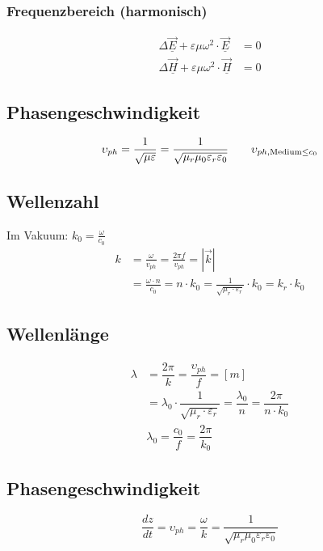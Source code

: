 \subsubsection{Frequenzbereich (harmonisch)}
\begin{align*}
    \Delta \underline{\vec{E}}+\varepsilon \mu \omega^{2} \cdot \underline{\vec{E}}&=0 \\
    \Delta \underline{\vec{H}}+\varepsilon \mu \omega^{2} \cdot \underline{\vec{H}}&=0
\end{align*}


\subsection{Phasengeschwindigkeit}
\[ \upsilon_{ph} = \frac{1}{\sqrt{ \mu \varepsilon}} = \frac{1}{\sqrt{ \mu_r \mu_0 \varepsilon_r \varepsilon_0}} \qquad \upsilon_{ph,\textnormal{Medium} \leq c_0} \]

\subsection{Wellenzahl}
Im Vakuum: $k_{0}=\frac{\omega}{c_{0}}$
\begin{align*}
    k &= \frac{\omega}{v_{p h}} = \frac{2 \pi f}{v_{p h}} = |\vec{k}|\\
      &= \frac{\omega \cdot n}{c_{0}} = n \cdot k_{0}=\frac{1}{\sqrt{\mu_{r} \cdot \varepsilon_{r}}} \cdot k_{0}=k_{r} \cdot k_{0}
\end{align*}

\subsection{Wellenlänge}
\begin{align*}
    \lambda &= \dfrac{2 \pi}{k} = \dfrac{\upsilon_{ph}}{f} = [m]\\
            &= \lambda_0 \cdot \dfrac{1}{\sqrt{\mu_r \cdot \varepsilon_r}} = \dfrac{\lambda_0}{n} = \dfrac{2 \pi}{n \cdot k_0}\\
            & \lambda_0 = \dfrac{c_0}{f} = \dfrac{2\pi}{k_0}
\end{align*}

\subsection{Phasengeschwindigkeit}
\[
    \dfrac{d z}{d t} = \upsilon_{ph} = \dfrac{\omega}{k} = \frac{1}{\sqrt{ \mu_r \mu_0 \varepsilon_r \varepsilon_0}}
\]

